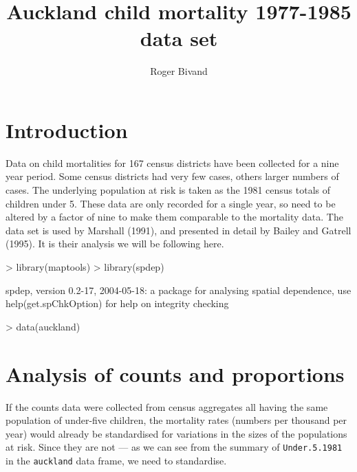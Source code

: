 \documentclass[a4paper,10pt]{article}
\title{Auckland child mortality 1977-1985 data set}
\author{Roger Bivand}
\newcommand{\code}[1]{\texttt{\small #1}}
\begin{document}
 

\maketitle 




\section{Introduction}

Data on child mortalities for 167 census districts have been collected for a nine year period. Some census districts had very few cases, others larger numbers of cases. The underlying population at risk is taken as the 1981 census totals of children under 5. These data are only recorded for a single year, so need to be altered by a factor of nine to make them comparable to the mortality data. The data set is used by Marshall (1991), and presented in detail by Bailey and Gatrell (1995). It is their analysis we will be following here.

\begin{footnotesize}
\begin{Schunk}
\begin{Sinput}
> library(maptools)
> library(spdep)
\end{Sinput}
\begin{Soutput}
spdep, version 0.2-17, 2004-05-18:
 a package for analysing spatial dependence,
 use help(get.spChkOption) for help on integrity checking
\end{Soutput}
\begin{Sinput}
> data(auckland)
\end{Sinput}
\end{Schunk}
\end{footnotesize}

\section{Analysis of counts and proportions}

If the counts data were collected from census aggregates all having the same population of under-five children, the mortality rates (numbers per thousand per year) would already be standardised for variations in the sizes of the populations at risk. Since they are not --- as we can see from the summary of \code{Under.5.1981} in the \code{auckland} data frame, we need to standardise.
\end{document}
